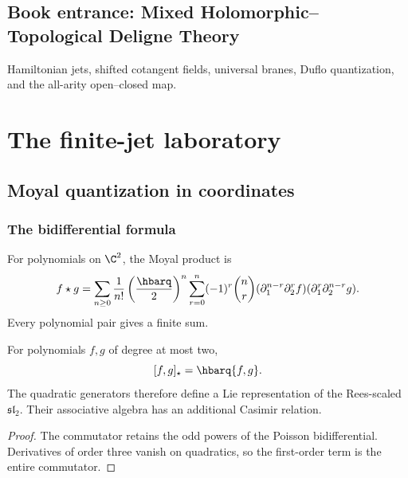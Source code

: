 \cleardoublepage
{}
{}
\chapter*{Book entrance: Mixed Holomorphic--Topological Deligne Theory}
\begin{summarybox}
Hamiltonian jets, shifted cotangent fields, universal branes, Duflo quantization, and the all-arity open--closed map.
\end{summarybox}
\part{The finite-jet laboratory}

\chapter{Moyal quantization in coordinates}
\section{The bidifferential formula}
For polynomials on $\C^2$, the Moyal product is
\begin{equation}\label{eq:vol2-moyal}
 f\star g
 =\sum_{n\ge0}\frac1{n!}\left(\frac{\hbarq}{2}\right)^n
 \sum_{r=0}^n(-1)^r\binom nr
 (\partial_1^{n-r}\partial_2^rf)
 (\partial_1^r\partial_2^{n-r}g).
\end{equation}
Every polynomial pair gives a finite sum.

\begin{theorem}
For polynomials $f,g$ of degree at most two,
\[
 [f,g]_\star=\hbarq\{f,g\}.
\]
The quadratic generators therefore define a Lie representation of the Rees-scaled $\mathfrak{sl}_2$.  Their associative algebra has an additional Casimir relation.
\end{theorem}
\begin{proof}
The commutator retains the odd powers of the Poisson bidifferential.  Derivatives of order three vanish on quadratics, so the first-order term is the entire commutator.
\end{proof}

